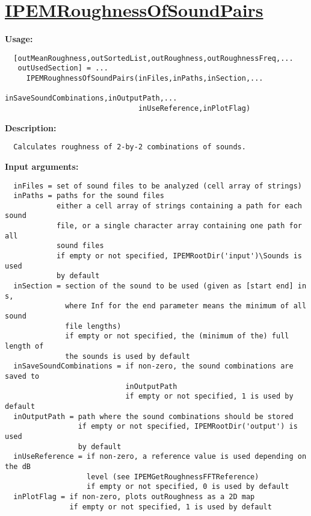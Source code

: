 \newpage
\section*{\hyperlink{Concepts:IPEMRoughnessOfSoundPairs}{IPEMRoughnessOfSoundPairs}}
\hypertarget{FuncRef:IPEMRoughnessOfSoundPairs}{}

\textbf{Usage:}
\begin{verbatim}  [outMeanRoughness,outSortedList,outRoughness,outRoughnessFreq,...
   outUsedSection] = ...
     IPEMRoughnessOfSoundPairs(inFiles,inPaths,inSection,...
                               inSaveSoundCombinations,inOutputPath,...
                               inUseReference,inPlotFlag)

\end{verbatim}
\textbf{Description:}
\begin{verbatim}  Calculates roughness of 2-by-2 combinations of sounds.

\end{verbatim}
\textbf{Input arguments:}
\begin{verbatim}  inFiles = set of sound files to be analyzed (cell array of strings)
  inPaths = paths for the sound files
            either a cell array of strings containing a path for each sound
            file, or a single character array containing one path for all
            sound files
            if empty or not specified, IPEMRootDir('input')\Sounds is used
            by default
  inSection = section of the sound to be used (given as [start end] in s,
              where Inf for the end parameter means the minimum of all sound
              file lengths)
              if empty or not specified, the (minimum of the) full length of
              the sounds is used by default
  inSaveSoundCombinations = if non-zero, the sound combinations are saved to
                            inOutputPath
                            if empty or not specified, 1 is used by default
  inOutputPath = path where the sound combinations should be stored
                 if empty or not specified, IPEMRootDir('output') is used
                 by default
  inUseReference = if non-zero, a reference value is used depending on the dB
                   level (see IPEMGetRoughnessFFTReference)
                   if empty or not specified, 0 is used by default 
  inPlotFlag = if non-zero, plots outRoughness as a 2D map
               if empty or not specified, 1 is used by default

\end{verbatim}
